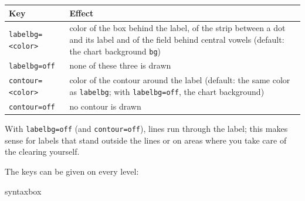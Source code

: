 \documentclass[a4paper,11pt]{article}
\newcommand\opt[1]{\texttt{#1}}
\begin{document}
\begin{center}
	\begin{tabular}{@{}lp{12.8cm}@{}}
		\toprule
		Key & Effect\\
		\midrule
		\opt{labelbg=<color>} & color of the box behind the label, of the strip between a dot and its label and of the field behind central vowels (default: the chart background \opt{bg})\\
		\opt{labelbg=off} & none of these three is drawn\\
		\opt{contour=<color>} & color of the contour around the label (default: the same color as \opt{labelbg}; with \opt{labelbg=off}, the chart background)\\
		\opt{contour=off} & no contour is drawn\\
		\bottomrule
	\end{tabular}
\end{center}

\noindent
With \opt{labelbg=off} (and \opt{contour=off}), lines run through the label; this makes sense for labels that stand outside the lines or on areas where you take care of the clearing yourself.

The keys can be given on every level:

\begin{tcblisting}{syntaxbox}
\end{tcblisting}
\end{document}
